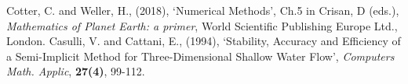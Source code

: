 \documentclass[a4paper,12pt, notitlepage]{article}
\begin{document}
\begin{thebibliography}{9}
	Cotter, C. and Weller, H., (2018), \textquoteleft Numerical Methods\textquoteright, Ch.5 in Crisan, D (eds.), \textit{Mathematics of Planet Earth: a primer}, World Scientific Publishing Europe Ltd., London.
	Casulli, V. and Cattani, E., (1994), \textquoteleft Stability, Accuracy and Efficiency of a Semi-Implicit Method for Three-Dimensional Shallow Water Flow\textquoteright, \textit{Computers Math. Applic}, \textbf{27(4)}, 99-112.
\end{thebibliography}
\end{document}
